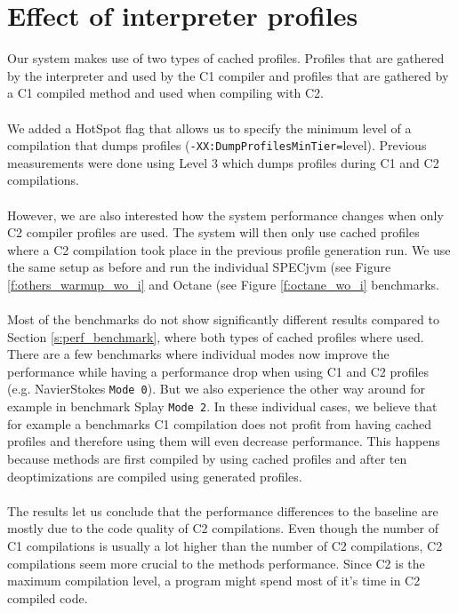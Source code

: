 \section{Effect of interpreter profiles}
\label{s:perf_interpreter_profiles}
Our system makes use of two types of cached profiles. Profiles that are gathered by the interpreter and used by the C1 compiler and profiles that are gathered by a C1 compiled method and used when compiling with C2.
\\\\
We added a HotSpot flag that allows us to specify the minimum level of a compilation that dumps profiles (\texttt{-XX:DumpProfilesMinTier=}level).
Previous measurements were done using Level 3 which dumps profiles during C1 and C2 compilations.
\\\\
However, we are also interested how the system performance changes when only C2 compiler profiles are used. The system will then only use cached profiles where a C2 compilation took place in the previous profile generation run. We use the same setup as before and run the individual SPECjvm (see Figure \ref{f:others_warmup_wo_i} and Octane (see Figure \ref{f:octane_wo_i} benchmarks. 
\\\\
Most of the benchmarks do not show significantly different results compared to Section \ref{s:perf_benchmark}, where both types of cached profiles where used. There are a few benchmarks where individual modes now improve the performance while having a performance drop when using C1 and C2 profiles (e.g. NavierStokes \texttt{Mode 0}). But we also experience the other way around for example in benchmark Splay \texttt{Mode 2}. In these individual cases, we believe that for example a benchmarks C1 compilation does not profit from having cached profiles and therefore using them will even decrease performance. This happens because methods are first compiled by using cached profiles and after ten deoptimizations are compiled using generated profiles.
\\\\
The results let us conclude that the performance differences to the baseline are mostly due to the code quality of C2 compilations. Even though the number of C1 compilations is usually a lot higher than the number of C2 compilations, C2 compilations seem more crucial to the methods performance.
Since C2 is the maximum compilation level, a program might spend most of it's time in C2 compiled code.
\\\\
